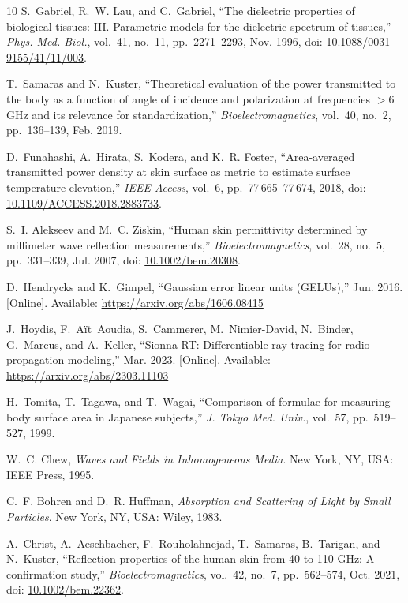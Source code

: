 \documentclass[journal,twocolumn,10pt]{IEEEtran}
\newcommand*{\doi}[1]{\href{https://doi.org/#1}{#1}}
\theoremstyle{plain}
\begin{document}
\begin{thebibliography}{10}
S.~Gabriel, R.~W. Lau, and C.~Gabriel, ``The dielectric properties of
  biological tissues: III. Parametric models for the dielectric spectrum
  of tissues,'' \emph{Phys. Med. Biol.}, vol.~41, no.~11,
  pp.~2271--2293, Nov. 1996, doi: \doi{10.1088/0031-9155/41/11/003}.

T.~Samaras and N.~Kuster, ``Theoretical evaluation of the power
  transmitted to the body as a function of angle of incidence and
  polarization at frequencies ${>}$6\,GHz and its relevance for
  standardization,'' \emph{Bioelectromagnetics}, vol.~40, no.~2,
  pp.~136--139, Feb. 2019.

D.~Funahashi, A.~Hirata, S.~Kodera, and K.~R. Foster, ``Area-averaged
  transmitted power density at skin surface as metric to estimate
  surface temperature elevation,'' \emph{IEEE Access}, vol.~6,
  pp.~77\,665--77\,674, 2018,
  doi: \doi{10.1109/ACCESS.2018.2883733}.

S.~I. Alekseev and M.~C. Ziskin, ``Human skin permittivity determined
  by millimeter wave reflection measurements,''
  \emph{Bioelectromagnetics}, vol.~28, no.~5, pp.~331--339, Jul. 2007,
  doi: \doi{10.1002/bem.20308}.

D.~Hendrycks and K.~Gimpel, ``Gaussian error linear units (GELUs),''
  Jun. 2016. [Online]. Available: \url{https://arxiv.org/abs/1606.08415}

J.~Hoydis, F.~A\"{i}t~Aoudia, S.~Cammerer, M.~Nimier-David, N.~Binder,
  G.~Marcus, and A.~Keller, ``Sionna RT: Differentiable ray tracing for
  radio propagation modeling,'' Mar. 2023. [Online]. Available:
  \url{https://arxiv.org/abs/2303.11103}

H.~Tomita, T.~Tagawa, and T.~Wagai, ``Comparison of formulae for
  measuring body surface area in Japanese subjects,'' \emph{J. Tokyo
  Med. Univ.}, vol.~57, pp.~519--527, 1999.

W.~C. Chew, \emph{Waves and Fields in Inhomogeneous Media}.
  New York, NY, USA: IEEE Press, 1995.

C.~F. Bohren and D.~R. Huffman, \emph{Absorption and Scattering of
  Light by Small Particles}.
  New York, NY, USA: Wiley, 1983.

A.~Christ, A.~Aeschbacher, F.~Rouholahnejad, T.~Samaras, B.~Tarigan,
  and N.~Kuster, ``Reflection properties of the human skin from 40 to
  110 GHz: A confirmation study,'' \emph{Bioelectromagnetics},
  vol.~42, no.~7, pp.~562--574, Oct. 2021,
  doi: \doi{10.1002/bem.22362}.


\end{thebibliography}
\end{document}
